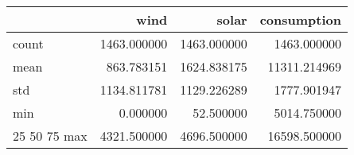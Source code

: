 \begin{tabular}{lrrr}
\toprule
 & wind & solar & consumption \\
\midrule
count & 1463.000000 & 1463.000000 & 1463.000000 \\
mean & 863.783151 & 1624.838175 & 11311.214969 \\
std & 1134.811781 & 1129.226289 & 1777.901947 \\
min & 0.000000 & 52.500000 & 5014.750000 \\
25%
50%
75%
max & 4321.500000 & 4696.500000 & 16598.500000 \\
\bottomrule
\end{tabular}
